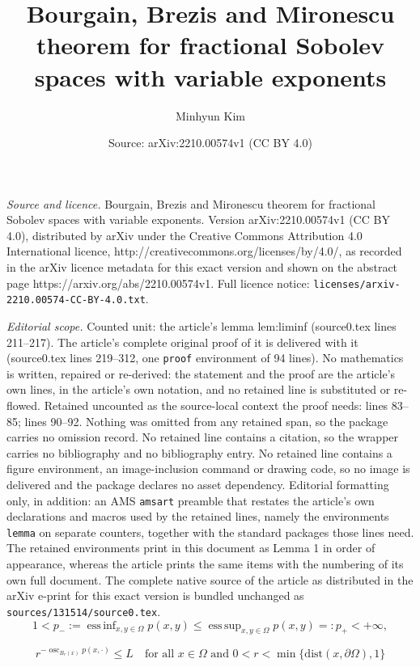 \documentclass[10pt,a4paper]{amsart}
\title{Bourgain, Brezis and Mironescu theorem for fractional Sobolev spaces with variable exponents}
\author{Minhyun Kim}
\date{Source: arXiv:2210.00574v1 (CC BY 4.0)}
\DeclareMathOperator*{\essinf}{ess\,inf}
\DeclareMathOperator*{\esssup}{ess\,sup}
\DeclareMathOperator{\osc}{osc}
\begin{document}
\maketitle

\noindent\emph{Source and licence.} Bourgain, Brezis and Mironescu theorem for fractional Sobolev spaces with variable exponents. Version arXiv:2210.00574v1 (CC BY 4.0), distributed by arXiv under the Creative Commons Attribution 4.0 International licence, http://creativecommons.org/licenses/by/4.0/, as recorded in the arXiv licence metadata for this exact version and shown on the abstract page https://arxiv.org/abs/2210.00574v1. Full licence notice: \texttt{licenses/arxiv-2210.00574-CC-BY-4.0.txt}.\par\smallskip

\noindent\textit{Editorial scope.} Counted unit: the article's lemma lem:liminf (source0.tex lines 211--217). The article's complete original proof of it is delivered with it (source0.tex lines 219--312, one \texttt{proof} environment of 94 lines). No mathematics is written, repaired or re-derived: the statement and the proof are the article's own lines, in the article's own notation, and no retained line is substituted or re-flowed.  Retained uncounted as the source-local context the proof needs: lines 83--85; lines 90--92.  Nothing was omitted from any retained span, so the package carries no omission record.  No retained line contains a citation, so the wrapper carries no bibliography and no bibliography entry.  No retained line contains a figure environment, an image-inclusion command or drawing code, so no image is delivered and the package declares no asset dependency.  Editorial formatting only, in addition: an AMS \texttt{amsart} preamble that restates the article's own declarations and macros used by the retained lines, namely the environments \texttt{lemma} on separate counters, together with the standard packages those lines need.  The retained environments print in this document as Lemma 1 in order of appearance, whereas the article prints the same items with the numbering of its own full document.  The complete native source of the article as distributed in the arXiv e-print for this exact version is bundled unchanged as \texttt{sources/131514/source0.tex}.
\begin{equation} \label{eq:p-bound}
1 < p_{-} := \essinf_{x, y \in \Omega} p(x, y) \leq \esssup_{x, y \in \Omega} p(x, y) =: p_{+} < +\infty,
\end{equation}

\begin{equation} \label{eq:p-log-Holder}
r^{-\osc_{B_{r}(x)} p(x, \cdot)} \leq L \quad \text{for all } x \in \Omega \text{ and } 0 < r < \min \lbrace \mathrm{dist}(x, \partial \Omega), 1 \rbrace
\end{equation}
\end{document}
